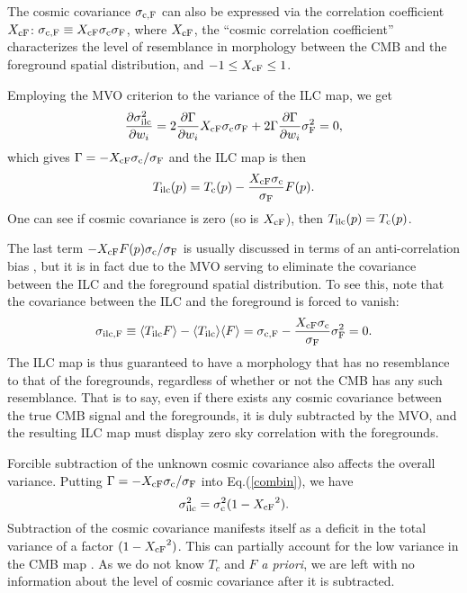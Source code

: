 \documentclass{emulateapj}
\def\cmb{{\rm c}}
\def\ilc{{\rm ilc}}
\def\fg{{\rm F}}
\def\xcf{{X_{\cmb \fg}}}
\begin{document}
The cosmic covariance $\sigma_{\cmb, \fg}$ can also be expressed via
the correlation coefficient $\xcf$: $ \sigma_{\cmb, \fg} \equiv \xcf
\sigma_\cmb \sigma_\fg$, where $\xcf$, the ``cosmic correlation
coefficient'' characterizes the level of resemblance in morphology
between the CMB and the foreground spatial distribution, and $-1 \le
\xcf \le 1$.

Employing the MVO criterion to the variance of the ILC map, we get
\begin{equation}
\frac{\partial \sigma_\ilc^2}{\partial w_i} = 2 \frac{\partial \Gamma}{\partial w_i}
\xcf \sigma_\cmb \sigma_\fg +2 \Gamma \frac{\partial \Gamma}{\partial w_i} \sigma_\fg^2 =0,
\end{equation}
which gives $\Gamma = -\xcf \sigma_\cmb/\sigma_\fg$ and the ILC map is then
\begin{equation}
T_\ilc (p)= T_\cmb (p) - \frac{\xcf \sigma_\cmb }{\sigma_\fg} F(p).
\label{ilcmap}
\end{equation}
One can see if cosmic covariance is zero (so is $\xcf$), then $T_\ilc
(p)= T_\cmb (p)$.

The last term $-\xcf  F(p)\sigma_\cmb /\sigma_\fg $ is usually
discussed in terms of an  anti-correlation bias \citep{wmap3ytem},
but it is in fact due to the MVO serving to eliminate the covariance
between the ILC and the foreground spatial distribution. To see
this, note that the covariance between the ILC and the foreground
is forced to vanish:
\begin{equation}
\sigma_{\ilc, \fg}\equiv \langle T_\ilc F \rangle - \langle T_\ilc
\rangle\langle F\rangle =\sigma_{\cmb, \fg}- \frac{\xcf
\sigma_\cmb}{\sigma_\fg} \sigma_\fg^2 = 0.
\end{equation}
The ILC map is thus guaranteed to have a morphology that has no
resemblance to that of the foregrounds, regardless of whether or not
the CMB has any such resemblance. That is to say, even if there
exists any cosmic covariance between the true CMB signal and the
foregrounds, it is duly subtracted by the MVO, and the resulting ILC
map must display zero sky correlation with the foregrounds.

Forcible subtraction of the unknown cosmic covariance also affects
the overall variance.  Putting $\Gamma = -\xcf
\sigma_\cmb/\sigma_\fg$ into Eq.(\ref{combin}), we have
\begin{equation}
\sigma_\ilc^2=\sigma_\cmb^2 (1-\xcf^2).
\end{equation}
Subtraction of the cosmic covariance manifests itself as a deficit
in the total variance of a factor $(1-\xcf^2)$. This can partially account for the low variance in the CMB map \citep{lowvar}. As we do not know
$T_c$ and $F$ {\it a priori}, we are left with no information about
the level of cosmic covariance after it is subtracted.
\end{document}
